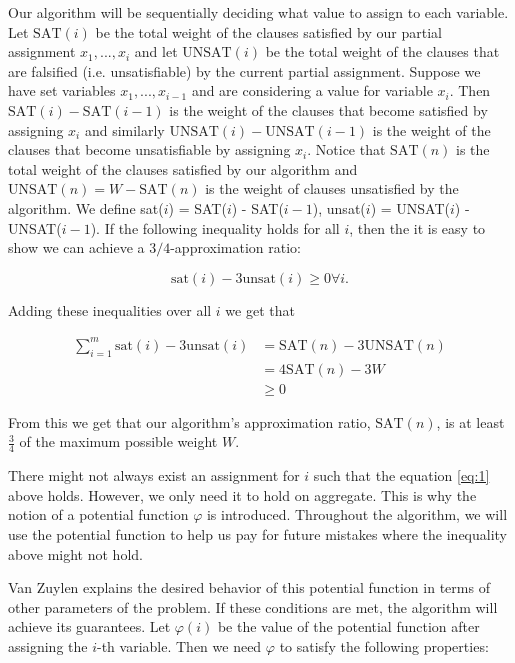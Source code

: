 \documentclass[11pt,letter]{article}
\numberwithin{theorem}{section}
\renewcommand{\phi}{\varphi}
\begin{document}
Our algorithm will be sequentially deciding what value to assign to each variable. Let $\mathrm{SAT}(i)$ be the total weight of the clauses
satisfied by our partial assignment $x_1, ..., x_i$ and let $\mathrm{UNSAT}(i)$ be the total weight of the clauses that are falsified (i.e. unsatisfiable) by the current partial assignment.
Suppose we have set variables $x_1,...,x_{i-1}$ and are considering a value for variable $x_i$. Then $\mathrm{SAT}(i)-\mathrm{SAT}(i-1)$ is the weight
of the clauses that become satisfied by assigning $x_i$ and similarly $\mathrm{UNSAT}(i) - \mathrm{UNSAT}(i-1)$ is the weight of the clauses that become
unsatisfiable by assigning $x_i$.
Notice that $\mathrm{SAT}(n)$ is the total weight of the clauses satisfied by our algorithm and $\mathrm{UNSAT}(n) = W - \mathrm{SAT}(n)$ is the weight of clauses
unsatisfied by the algorithm. We define sat($i$) = SAT($i$) - SAT($i-1$), unsat($i$) = UNSAT($i$) - UNSAT($i-1$). If the following inequality holds for all $i$, then the it is easy to show we can achieve a $3/4$-approximation ratio:

\begin{equation}
\label{eq:1}
\mathrm{sat}(i) - 3\mathrm{unsat}(i) \geq 0 \forall i.
\end{equation}

Adding these inequalities over all $i$ we get that

\begin{equation*}
\begin{aligned}
\sum_{i = 1}^{m} \mathrm{sat}(i) - 3\mathrm{unsat}(i) & = \mathrm{SAT}(n) - 3\mathrm{UNSAT}(n) \\
& = 4\mathrm{SAT}(n) - 3W \\
& \geq 0
\end{aligned}
\end{equation*}

From this we get that our algorithm's approximation ratio, $\textrm{SAT}(n)$, is at least $\frac{3}{4}$ of the maximum possible weight $W$.

There might not always exist an assignment for $i$ such that the equation \ref{eq:1} above holds. However, we only need it to hold on aggregate.
This is why the notion of a potential function $\phi$ is introduced. Throughout the algorithm, we will use the potential function to help us pay
for future mistakes where the inequality above might not hold.

Van Zuylen explains the desired behavior of this potential function in terms of other parameters of the problem. If these conditions are met, the algorithm
will achieve its guarantees. Let $\phi(i)$ be the value of the potential function after assigning the $i$-th variable. Then we need $\phi$ to satisfy the following properties:
\end{document}
